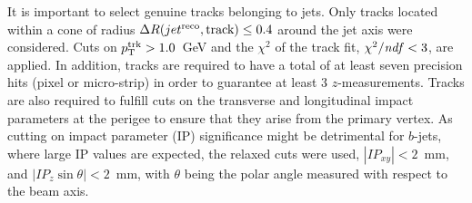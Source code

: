
It is important to select genuine tracks belonging to jets. Only tracks located  within a cone of radius $\Delta R(jet^{\rm reco},\rm track) \leq 0.4$ around the jet axis were considered. %
  Cuts on $p_{\rm{T}}^{\rm{trk}}>1.0$~GeV and the $\chi^2$ of the track fit, $\chi^2/{\it ndf}<3$, are applied. %
 In addition, tracks are required to have a total of at least seven precision hits (pixel or micro-strip) in order to guarantee at least 3 $z$-measurements. Tracks are also required to fulfill cuts on the transverse and longitudinal impact parameters at the perigee to ensure that they arise from  the primary vertex. As cutting on impact parameter (IP) significance might be detrimental for $b$-jets, where large IP values are expected, the relaxed cuts were used, $|IP_{xy}|<2$~mm, and $|IP_{z}\sin\theta|<2$~mm, with $\theta$ being the polar angle measured with respect to the beam axis. %




